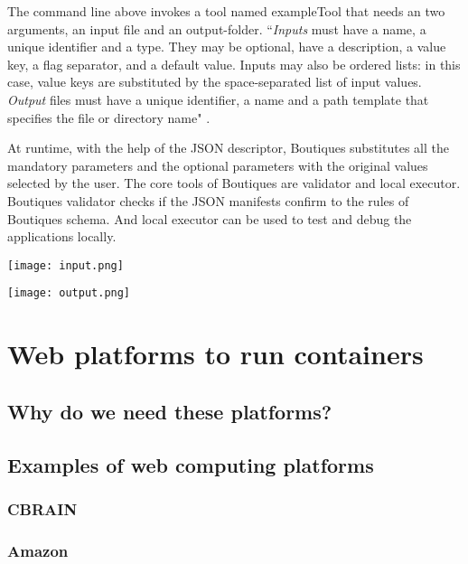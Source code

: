 The command line above invokes a tool named exampleTool that needs an two arguments, an input file and an output-folder.
``\textit{Inputs} must have a name, a unique identifier and a type. They may be optional, have a description, a value key, a flag separator, and a default value. Inputs may also be ordered lists: in this case, value keys are substituted by the space-separated list of input values. \textit{Output} files must have a unique identifier, a name and a path template that specifies the file or directory name" \cite{boutiques}.

At runtime, with the help of the JSON descriptor, Boutiques substitutes all the mandatory parameters and the optional parameters with the original values selected by the user. The core tools of Boutiques are validator and local executor. Boutiques validator checks if the JSON manifests confirm to the rules of Boutiques schema. And local executor can be used to test and debug the applications locally.

\begin{center}
\texttt{[image: input.png]}
\label{fig:input}
\end{center}

\begin{center}
\texttt{[image: output.png]}
\label{fig:output}
\end{center}



\section{Web platforms to run containers}
\subsection{Why do we need these platforms?}
\subsection{Examples of web computing platforms}
\subsubsection{CBRAIN}
\subsubsection{Amazon}

